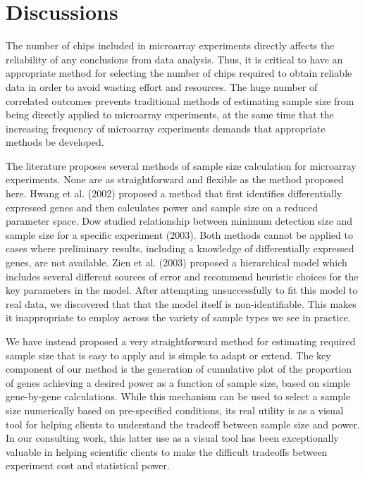 \documentclass{bioinfo}
\begin{document}
\section{Discussions}

The number of chips included in microarray experiments directly
affects the reliability of any conclusions from data analysis.
Thus, it is critical to have an appropriate method for selecting the
number of chips required to obtain reliable data in order to avoid
wasting effort and resources. The huge number of correlated outcomes
prevents traditional methods of estimating sample size from being
directly applied to microarray experiments, at the same time that
the increasing frequency of microarray experiments demands that
appropriate methods be developed.

The literature proposes several methods of sample size calculation
for microarray experiments. None are as straightforward and flexible
as the method proposed here. Hwang et al. (2002) proposed a method
that first identifies differentially expressed
genes and then calculates power and sample size on a reduced
parameter space. Dow studied relationship between minimum detection
size and sample size for a specific experiment (2003). Both methods
cannot be applied to cases where preliminary results, including a
knowledge of differentially expressed genes, are not available. Zien
et al.  (2003) proposed a hierarchical model which includes several
different sources of error and recommend heuristic choices for the
key parameters in the model.  After attempting unsuccessfully to fit
this model to real data, we discovered that that the model itself is
non-identifiable.  This makes it inappropriate to employ across the
variety of sample types we see in practice.

We have instead proposed a very straightforward method for
estimating required sample size that is easy to apply and is simple
to adapt or extend. The key component of our method is the
generation of cumulative plot of the proportion of genes achieving a
desired power as a function of sample size, based on simple
gene-by-gene calculations.  While this mechanism can be used to
select a sample size numerically based on pre-specified conditions,
its real utility is as a visual tool for helping clients to
understand the tradeoff between sample size and power.  In our
consulting work, this latter use as a visual tool has been
exceptionally valuable in helping scientific clients to make the
difficult tradeoffs between experiment cost and statistical power.
\end{document}
